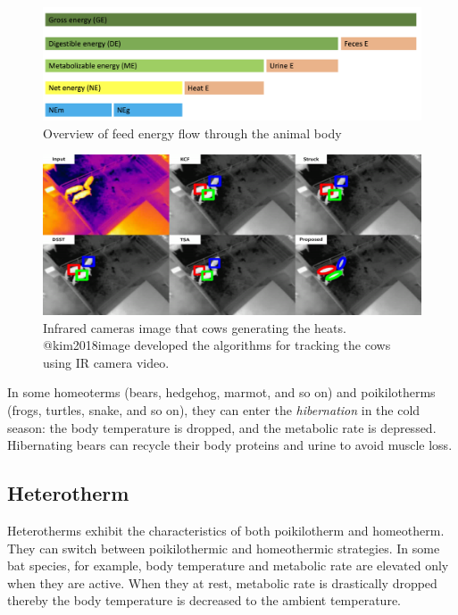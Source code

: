 \documentclass[]{book}
\begin{document}
\begin{figure}

{\centering \includegraphics[width=1\linewidth]{figures/energy-system} 

}

\caption{Overview of feed energy flow through the animal body}\label{fig:e-system}
\end{figure}

\begin{figure}

{\centering \includegraphics[width=1\linewidth]{figures/kimetal} 

}

\caption{Infrared cameras image that cows generating the heats. @kim2018image developed the algorithms for tracking the cows using IR camera video.}\label{fig:kimetal}
\end{figure}

In some homeoterms (bears, hedgehog, marmot, and so on) and poikilotherms (frogs, turtles, snake, and so on), they can enter the \emph{hibernation} in the cold season: the body temperature is dropped, and the metabolic rate is depressed. Hibernating bears can recycle their body proteins and urine to avoid muscle loss.

\hypertarget{heterotherm}{%
\subsection{Heterotherm}\label{heterotherm}}

Heterotherms exhibit the characteristics of both poikilotherm and homeotherm. They can switch between poikilothermic and homeothermic strategies. In some bat species, for example, body temperature and metabolic rate are elevated only when they are active. When they at rest, metabolic rate is drastically dropped thereby the body temperature is decreased to the ambient temperature.
\end{document}

